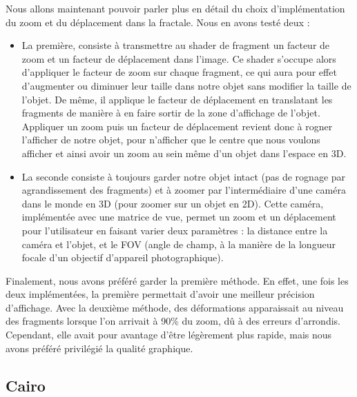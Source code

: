 \documentclass[11pt]{article}
\begin{document}
Nous allons maintenant pouvoir parler plus en détail du choix d'implémentation
du zoom et du déplacement dans la fractale. Nous en avons testé deux :
\begin{itemize}
    \item La première, consiste à transmettre au shader de fragment un facteur
        de zoom et un facteur de déplacement dans l'image. Ce shader s'occupe
        alors d'appliquer le facteur de zoom sur chaque fragment, ce qui aura
        pour effet d'augmenter ou diminuer leur taille dans notre objet sans
        modifier la taille de l'objet. De même, il applique le facteur de
        déplacement en translatant les fragments de manière à en faire sortir de
        la zone d'affichage de l'objet. Appliquer un zoom puis un facteur de
        déplacement revient donc à rogner l'afficher de notre objet, pour
        n'afficher que le centre que nous voulons afficher et ainsi avoir un
        zoom au sein même d'un objet dans l'espace en 3D.
    \item La seconde consiste à toujours garder notre objet intact (pas de
        rognage par agrandissement des fragments) et à zoomer par
        l'intermédiaire d'une caméra dans le monde en 3D (pour zoomer sur un
        objet en 2D). Cette caméra, implémentée avec une matrice de vue, permet
        un zoom et un déplacement pour l'utilisateur en faisant varier deux
        paramètres : la distance entre la caméra et l'objet, et le FOV (angle de
        champ, à la manière de la longueur focale d'un objectif d'appareil
        photographique).
\end{itemize}
Finalement, nous avons préféré garder la première méthode. En effet, une fois
les deux implémentées, la première permettait d'avoir une meilleur précision
d'affichage. Avec la deuxième méthode, des déformations apparaissait au niveau
des fragments lorsque l'on arrivait à 90\% du zoom, dû à des erreurs d'arrondis.
Cependant, elle avait pour avantage d'être légèrement plus rapide, mais nous
avons préféré privilégié la qualité graphique.

\subsection{Cairo}
\end{document}
